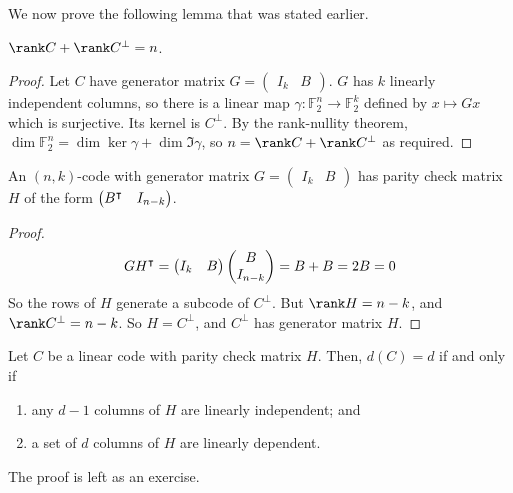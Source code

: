 We now prove the following lemma that was stated earlier.
\begin{lemma}
    $\rank C + \rank C^\perp = n$.
\end{lemma}
\begin{proof}
    Let $C$ have generator matrix $G = \begin{pmatrix}
        I_k & B
    \end{pmatrix}$.
    $G$ has $k$ linearly independent columns, so there is a linear map $\gamma \colon \mathbb F_2^n \to \mathbb F_2^k$ defined by $x \mapsto Gx$ which is surjective.
    Its kernel is $C^\perp$.
    By the rank-nullity theorem, $\dim \mathbb F_2^n = \dim \ker \gamma + \dim \Im \gamma$, so $n = \rank C + \rank C^\perp$ as required.
\end{proof}
\begin{lemma}
    An $(n, k)$-code with generator matrix $G = \begin{pmatrix}
        I_k & B
    \end{pmatrix}$ has parity check matrix $H$ of the form $\begin{pmatrix}
        B^\intercal & I_{n-k}
    \end{pmatrix}$.
\end{lemma}
\begin{proof}
    \[ GH^\intercal = \begin{pmatrix}
        I_k & B
    \end{pmatrix} \begin{pmatrix}
        B \\
        I_{n-k}
    \end{pmatrix} = B + B = 2B = 0 \]
    So the rows of $H$ generate a subcode of $C^\perp$.
    But $\rank H = n - k$, and $\rank C^\perp = n - k$.
    So $H = C^\perp$, and $C^\perp$ has generator matrix $H$.
\end{proof}
\begin{lemma}
    Let $C$ be a linear code with parity check matrix $H$.
    Then, $d(C) = d$ if and only if
    \begin{enumerate}
        \item any $d - 1$ columns of $H$ are linearly independent; and
        \item a set of $d$ columns of $H$ are linearly dependent.
    \end{enumerate}
\end{lemma}
The proof is left as an exercise.

